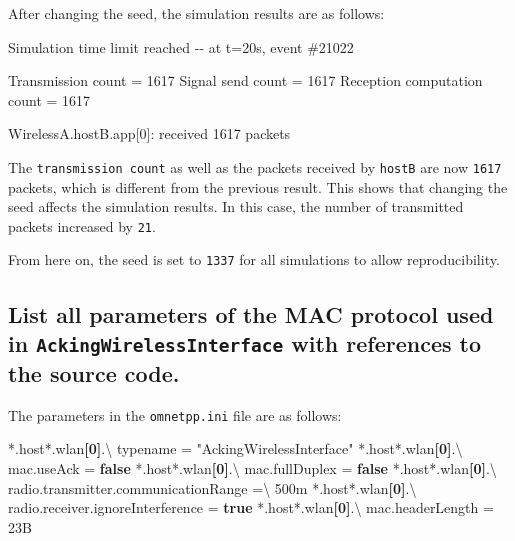 \documentclass[
  letterpaper,
  DIV=11,
  numbers=noendperiod]{scrartcl}
\newenvironment{Shaded}{\begin{snugshade}}{\end{snugshade}}
\newcommand{\DataTypeTok}[1]{\textcolor[rgb]{0.68,0.00,0.00}{#1}}
\newcommand{\KeywordTok}[1]{\textcolor[rgb]{0.00,0.23,0.31}{\textbf{#1}}}
\newcommand{\NormalTok}[1]{\textcolor[rgb]{0.00,0.23,0.31}{#1}}
\newcommand{\OtherTok}[1]{\textcolor[rgb]{0.00,0.23,0.31}{#1}}
\newcommand{\StringTok}[1]{\textcolor[rgb]{0.13,0.47,0.30}{#1}}
\begin{document}
After changing the seed, the simulation results are as follows:

\begin{Shaded}
\begin{Highlighting}[]
\NormalTok{Simulation time limit reached {-}{-}}
\NormalTok{  at t=20s, event \#21022}

\NormalTok{Transmission count = 1617}
\NormalTok{Signal send count = 1617}
\NormalTok{Reception computation count = 1617}

\NormalTok{WirelessA.hostB.app[0]:}
\NormalTok{  received 1617 packets}
\end{Highlighting}
\end{Shaded}

The \texttt{transmission\ count} as well as the packets received by
\texttt{hostB} are now \texttt{1617} packets, which is different from
the previous result. This shows that changing the seed affects the
simulation results. In this case, the number of transmitted packets
increased by \texttt{21}.

From here on, the seed is set to \texttt{1337} for all simulations to
allow reproducibility.

\subsection{\texorpdfstring{List all parameters of the MAC protocol used
in \texttt{AckingWirelessInterface} with references to the source
code.}{List all parameters of the MAC protocol used in AckingWirelessInterface with references to the source code.}}\label{list-all-parameters-of-the-mac-protocol-used-in-ackingwirelessinterface-with-references-to-the-source-code.}

The parameters in the \texttt{omnetpp.ini} file are as follows:

\begin{Shaded}
\begin{Highlighting}[]
\DataTypeTok{*.host*.wlan}\KeywordTok{[0]}\DataTypeTok{.\textbackslash{}}
\DataTypeTok{  typename }\OtherTok{=}\StringTok{ "AckingWirelessInterface"}
\DataTypeTok{*.host*.wlan}\KeywordTok{[0]}\DataTypeTok{.\textbackslash{}}
\DataTypeTok{  mac.useAck }\OtherTok{=}\StringTok{ }\KeywordTok{false}
\DataTypeTok{*.host*.wlan}\KeywordTok{[0]}\DataTypeTok{.\textbackslash{}}
\DataTypeTok{  mac.fullDuplex }\OtherTok{=}\StringTok{ }\KeywordTok{false}
\DataTypeTok{*.host*.wlan}\KeywordTok{[0]}\DataTypeTok{.\textbackslash{}}
\DataTypeTok{  radio.transmitter.communicationRange }\OtherTok{=}\StringTok{\textbackslash{}}
\DataTypeTok{    500m}
\DataTypeTok{*.host*.wlan}\KeywordTok{[0]}\DataTypeTok{.\textbackslash{}}
\DataTypeTok{  radio.receiver.ignoreInterference }\OtherTok{=}\StringTok{ }\KeywordTok{true}
\DataTypeTok{*.host*.wlan}\KeywordTok{[0]}\DataTypeTok{.\textbackslash{}}
\DataTypeTok{  mac.headerLength }\OtherTok{=}\StringTok{ 23B}
\end{Highlighting}
\end{Shaded}
\end{document}
